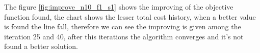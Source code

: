 
The figure \ref{fig:improve_n10_f1_s1} shows the improving of the objective function found, the chart shows the lesser total cost history, when a better value is found the line fall, therefore we can see the improving is given among the iteration 25 and 40, after this iterations the algorithm converges and it's not found a better solution.





